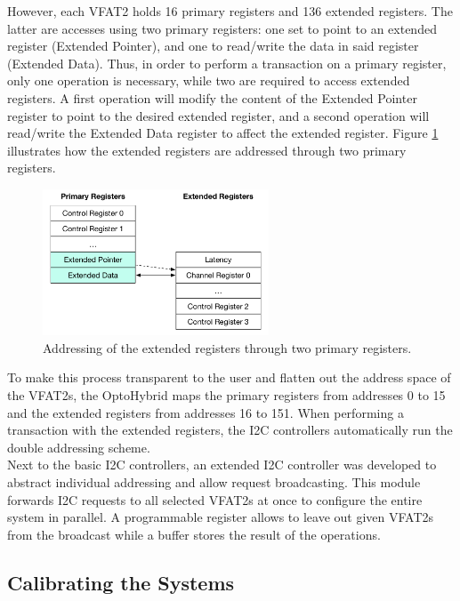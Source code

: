       However, each VFAT2 holds 16 primary registers and 136 extended registers. The latter are accesses using two primary registers: one set to point to an extended register (Extended Pointer), and one to read/write the data in said register (Extended Data). Thus, in order to perform a transaction on a primary register, only one operation is necessary, while two are required to access extended registers. A first operation will modify the content of the Extended Pointer register to point to the desired extended register, and a second operation will read/write the Extended Data register to affect the extended register. Figure \ref{fig:II-3-i2c-extended} illustrates how the extended registers are addressed through two primary registers. \\

      \begin{figure}[h!]
        \centering
        \includegraphics[width=0.6\textwidth]{img/II-3-test-beam/i2c-extended}
        \caption{Addressing of the extended registers through two primary registers.}
        \label{fig:II-3-i2c-extended}
      \end{figure}

      To make this process transparent to the user and flatten out the address space of the VFAT2s, the OptoHybrid maps the primary registers from addresses 0 to 15 and the extended registers from addresses 16 to 151. When performing a transaction with the extended registers, the I2C controllers automatically run the double addressing scheme. \\

      Next to the basic I2C controllers, an extended I2C controller was developed to abstract individual addressing and allow request broadcasting. This module forwards I2C requests to all selected VFAT2s at once to configure the entire system in parallel. A programmable register allows to leave out given VFAT2s from the broadcast while a buffer stores the result of the operations.

    \subsection{Calibrating the Systems}

